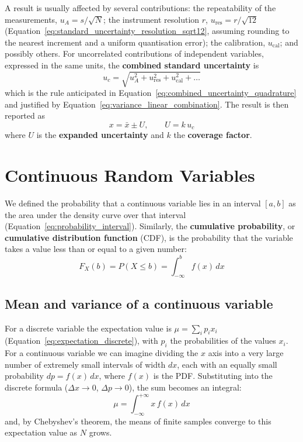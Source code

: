 \documentclass[letterpaper,11pt,leqno]{book}
\begin{document}
\label{sec:combined_uncertainty}

A result is usually affected by several contributions: the repeatability of the measurements, $u_A = s/\sqrt{N}$; the instrument resolution $r$, $u_{\text{res}} = r/\sqrt{12}$ (Equation~\eqref{eq:standard_uncertainty_resolution_sqrt12}, assuming rounding to the nearest increment and a uniform quantisation error); the calibration, $u_{\text{cal}}$; and possibly others. For uncorrelated contributions of independent variables, expressed in the same units, the \textbf{combined standard uncertainty} is
\begin{equation}
\boxed{u_c = \sqrt{u_A^2 + u_{\text{res}}^2 + u_{\text{cal}}^2 + \dots}}
\label{eq:combined_standard_uncertainty}
\end{equation}
which is the rule anticipated in Equation~\eqref{eq:combined_uncertainty_quadrature} and justified by Equation~\eqref{eq:variance_linear_combination}. The result is then reported as
\begin{equation}
\boxed{x = \bar{x} \pm U, \qquad U = k\,u_c}
\label{eq:expanded_uncertainty}
\end{equation}
where $U$ is the \textbf{expanded uncertainty} and $k$ the \textbf{coverage factor}.

\section{Continuous Random Variables}
\label{sec:continuous}

We defined the probability that a continuous variable lies in an interval $[a, b]$ as the area under the density curve over that interval (Equation~\eqref{eq:probability_interval}). Similarly, the \textbf{cumulative probability}, or \textbf{cumulative distribution function} (CDF), is the probability that the variable takes a value less than or equal to a given number:
\begin{equation}
\boxed{F_X(b) = P(X \le b) = \int_{-\infty}^{b}f(x)\,dx}
\label{eq:cdf}
\end{equation}

\subsection{Mean and variance of a continuous variable}

For a discrete variable the expectation value is $\mu = \sum_i p_ix_i$ (Equation~\eqref{eq:expectation_discrete}), with $p_i$ the probabilities of the values $x_i$. For a continuous variable we can imagine dividing the $x$ axis into a very large number of extremely small intervals of width $dx$, each with an equally small probability $dp = f(x)\,dx$, where $f(x)$ is the PDF. Substituting into the discrete formula ($\Delta x \to 0$, $\Delta p \to 0$), the sum becomes an integral:
\begin{equation}
\boxed{\mu = \int_{-\infty}^{+\infty}x\,f(x)\,dx}
\label{eq:expectation_continuous}
\end{equation}
and, by Chebyshev's theorem, the means of finite samples converge to this expectation value as $N$ grows.
\end{document}
